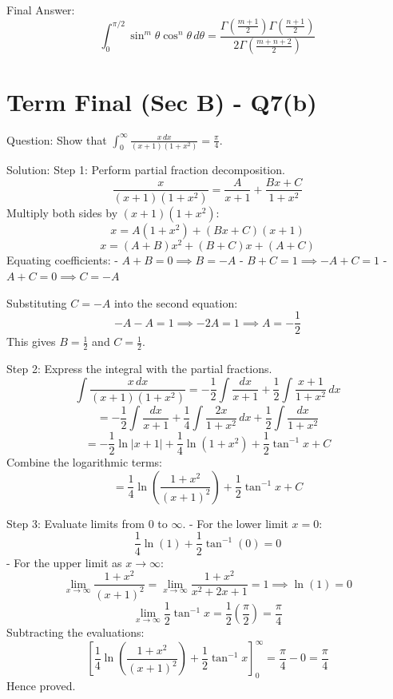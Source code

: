 \documentclass{article}
\begin{document}
Final Answer:
\[
\boxed{\int_0^{\pi/2} \sin^m\theta \cos^n\theta \, d\theta = \frac{\Gamma\left(\frac{m+1}{2}\right)\Gamma\left(\frac{n+1}{2}\right)}{2\Gamma\left(\frac{m+n+2}{2}\right)}}
\]

\section*{Term Final (Sec B) - Q7(b)}
Question:
Show that $\int_0^\infty \frac{x \, dx}{(x+1)(1+x^2)} = \frac{\pi}{4}$.

Solution:
Step 1: Perform partial fraction decomposition.
\[
\frac{x}{(x+1)(1+x^2)} = \frac{A}{x+1} + \frac{Bx+C}{1+x^2}
\]
Multiply both sides by $(x+1)(1+x^2)$:
\[
x = A(1+x^2) + (Bx+C)(x+1)
\]
\[
x = (A+B)x^2 + (B+C)x + (A+C)
\]
Equating coefficients:
- $A+B = 0 \implies B = -A$
- $B+C = 1 \implies -A+C = 1$
- $A+C = 0 \implies C = -A$

Substituting $C = -A$ into the second equation:
\[
-A - A = 1 \implies -2A = 1 \implies A = -\frac{1}{2}
\]
This gives $B = \frac{1}{2}$ and $C = \frac{1}{2}$.

Step 2: Express the integral with the partial fractions.
\[
\int \frac{x \, dx}{(x+1)(1+x^2)} = -\frac{1}{2} \int \frac{dx}{x+1} + \frac{1}{2} \int \frac{x+1}{1+x^2} \, dx
\]
\[
= -\frac{1}{2} \int \frac{dx}{x+1} + \frac{1}{4} \int \frac{2x}{1+x^2} \, dx + \frac{1}{2} \int \frac{dx}{1+x^2}
\]
\[
= -\frac{1}{2}\ln|x+1| + \frac{1}{4}\ln(1+x^2) + \frac{1}{2}\tan^{-1} x + C
\]
Combine the logarithmic terms:
\[
= \frac{1}{4}\ln\left( \frac{1+x^2}{(x+1)^2} \right) + \frac{1}{2}\tan^{-1} x + C
\]

Step 3: Evaluate limits from $0$ to $\infty$.
- For the lower limit $x = 0$:
  \[
  \frac{1}{4}\ln(1) + \frac{1}{2}\tan^{-1}(0) = 0
  \]
- For the upper limit as $x \to \infty$:
  \[
  \lim_{x \to \infty} \frac{1+x^2}{(x+1)^2} = \lim_{x \to \infty} \frac{1+x^2}{x^2+2x+1} = 1 \implies \ln(1) = 0
  \]
  \[
  \lim_{x \to \infty} \frac{1}{2}\tan^{-1} x = \frac{1}{2}\left(\frac{\pi}{2}\right) = \frac{\pi}{4}
  \]
Subtracting the evaluations:
\[
\left[ \frac{1}{4}\ln\left(\frac{1+x^2}{(x+1)^2}\right) + \frac{1}{2}\tan^{-1} x \right]_0^\infty = \frac{\pi}{4} - 0 = \frac{\pi}{4}
\]
Hence proved.
\end{document}
